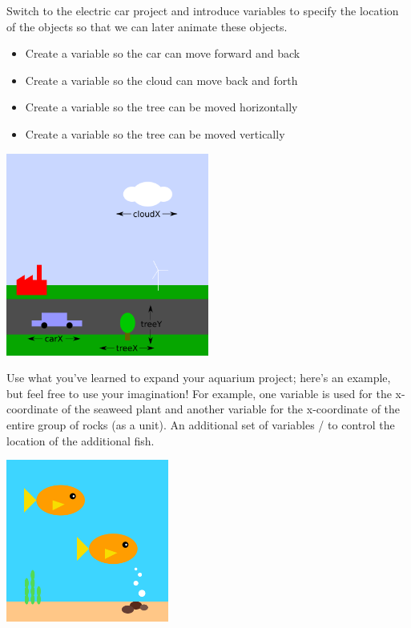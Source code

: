 \newpage
\begin{exercisebox}[adjusted title= Green City continues]
Switch to the electric car project and introduce variables to specify the
location of the objects so that we can later animate these objects.

\begin{itemize}
\item Create a variable  so the car can move forward
  and back
\item Create a variable  so the cloud can move back and forth
\item Create a variable  so the tree can be moved horizontally
\item Create a variable  so the tree can be moved vertically
\end{itemize}
\begin{center}
\includegraphics[width=0.5\textwidth]{illustrationer/carX-cloudX-treeXY.png}
\end{center}
\end{exercisebox}

\begin{exercisebox}[adjusted title=Aquarium Continues]
Use what you've learned to expand your aquarium project; here's an
example, but feel free to use your imagination! For example, one variable is used
for the x-coordinate of the seaweed plant and another variable for the x-coordinate
of the entire group of rocks (as a unit). An additional set of
variables / to control the location of the
additional fish.%

\begin{center}
\includegraphics[width=0.4\textwidth]{illustrationer/akvarie.png}
\end{center}

\end{exercisebox}

